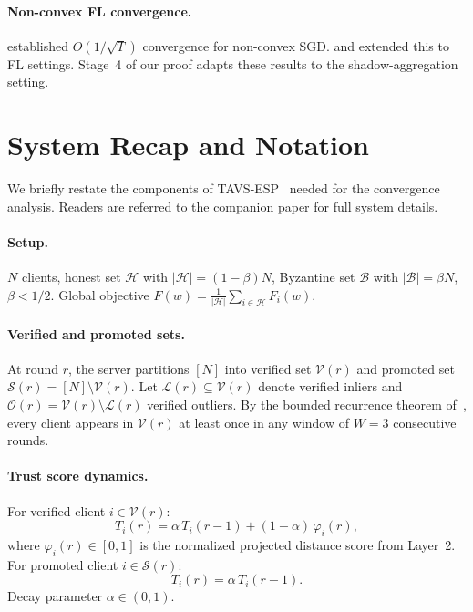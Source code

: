 \documentclass{article}
\newcommand{\calH}{\mathcal{H}}
\newcommand{\calB}{\mathcal{B}}
\newcommand{\calV}{\mathcal{V}}
\newcommand{\calS}{\mathcal{S}}
\newcommand{\calL}{\mathcal{L}}
\newcommand{\calO}{\mathcal{O}}
\newcommand{\TAVESP}{\textsc{TAVS-ESP}}
\begin{document}
\paragraph{Non-convex FL convergence.}
\citet{ghadimi2013stochastic} established $O(1/\sqrt{T})$ convergence for
non-convex SGD.
\citet{yang2021achieving} and \citet{zhu2022olive} extended this to FL
settings.
Stage~4 of our proof adapts these results to the shadow-aggregation setting.

\section{System Recap and Notation}
\label{sec:recap}

We briefly restate the components of \TAVESP{}~\citep{paper1} needed for
the convergence analysis.
Readers are referred to the companion paper for full system details.

\paragraph{Setup.}
$N$ clients, honest set $\calH$ with $|\calH| = (1-\beta)N$,
Byzantine set $\calB$ with $|\calB| = \beta N$, $\beta < 1/2$.
Global objective $F(w) = \frac{1}{|\calH|}\sum_{i \in \calH} F_i(w)$.

\paragraph{Verified and promoted sets.}
At round $r$, the server partitions $[N]$ into verified set $\calV(r)$
and promoted set $\calS(r) = [N] \setminus \calV(r)$.
Let $\calL(r) \subseteq \calV(r)$ denote verified inliers and
$\calO(r) = \calV(r) \setminus \calL(r)$ verified outliers.
By the bounded recurrence theorem of~\citet{paper1}, every client appears
in $\calV(r)$ at least once in any window of $W=3$ consecutive rounds.

\paragraph{Trust score dynamics.}
For verified client $i \in \calV(r)$:
\begin{equation}
  T_i(r) = \alpha\, T_i(r{-}1) + (1-\alpha)\,\varphi_i(r),
  \label{eq:trust_update_verified}
\end{equation}
where $\varphi_i(r) \in [0,1]$ is the normalized projected distance score
from Layer~2.
For promoted client $i \in \calS(r)$:
\begin{equation}
  T_i(r) = \alpha\, T_i(r{-}1).
  \label{eq:trust_update_promoted}
\end{equation}
Decay parameter $\alpha \in (0,1)$.
\end{document}
